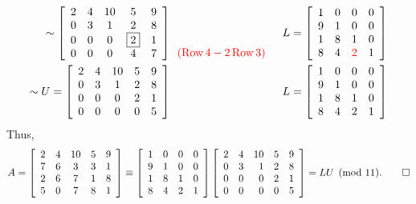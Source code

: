 \begin{Exam}
\begin{eqnarray*}
\sim \mtx{ccccc}{2&4&10&5&9\\0&3&1&2&8\\0&0&0&\fbox{$2$}&1\\0&0&0&4&7}\begin{array}{l} \mbox{}\\\mbox{} \\\mbox{} \\\color{red}(\row 4 - 2\row 3)\end{array} && L = \mtx{rrrr}{1&0&0&0\\9&1&0&0\\1&8 &1&0\\8&4 &\color{red} 2 &1}\\
\sim U=\mtx{ccccc}{2&4&10&5&9\\0&3&1&2&8\\0&0&0&2&1\\0&0&0&0&5}\begin{array}{l} \mbox{}\\\mbox{} \\\mbox{} \\ \phantom{(\row 4 - 0\row 3)}\end{array} && L = \mtx{rrrr}{1&0&0&0\\9&1&0&0\\1&8 &1&0\\8&4 & 2 &1}
\end{eqnarray*}
Thus, \[A = \mtx{ccccc}{2&4&10&5&9\\7&6&3&3&1\\2&6&7&1&8\\5&0&7&8&1} \equiv \mtx{rrrr}{1&0&0&0\\9&1&0&0\\1&8 &1&0\\8&4 & 2 &1}\mtx{rrrrr}{2&4&10&5&9\\0&3&1&2&8\\0&0&0&2&1\\0&0&0&0&5} = LU \pmod{11}.\qedhere\]
\end{Exam}\vs

